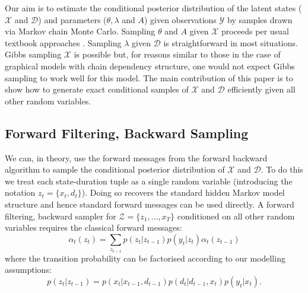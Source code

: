 Our aim is to estimate the conditional posterior distribution of the latent states ($\mathcal{X}$ and $\mathcal{D}$) and parameters ($\theta, \lambda$ and $A$) given observations $\mathcal{Y}$ by samples drawn via Markov chain Monte Carlo. Sampling $\theta$ and $A$ given $\mathcal{X}$ proceeds per usual textbook approaches \cite{Bishop06}.  Sampling $\lambda$ given $\mathcal{D}$ is straightforward in most situations.  Gibbs sampling  $\mathcal{X}$ is possible but, for reasons similar to those in the case of graphical models with chain dependency structure, one would not expect Gibbs sampling to work well for this model.  The main contribution of this paper is to show how to generate exact conditional samples of  $\mathcal{X}$ and $\mathcal{D}$ efficiently given all other random variables.

\subsection{Forward Filtering, Backward Sampling}

We can, in theory, use the forward messages from the forward backward algorithm \cite{Rabiner89} to sample the conditional posterior distribution of $\mathcal{X}$ and $\mathcal{D}.$   To do this we treat each state-duration tuple as a single random variable 
(introducing the notation $z_t = \{x_t,d_t\}$).  
Doing so recovers the standard hidden Markov model structure and hence standard forward messages can be used directly.  A forward filtering, backward sampler for $\mathcal{Z} = \{z_1, \ldots, x_T\}$ conditioned on 
all other random variables
requires the classical forward messages:
    \begin{equation}
        \alpha_t(z_t) = 
        \sum_{z_{t-1}}
        p(z_t | z_{t-1}) 
        p(y_t|z_t) 
        \alpha_t(z_{t-1}) 
        \label{eqn:forward recursion}
    \end{equation}
     where the transition probability can be factorised according to our modelling assumptions:
     \begin{equation}
        p(z_{t} | z_{t-1}) = p(x_t | x_{t-1}, d_{t-1}) p(d_t | d_{t-1}, x_t) p(y_t|x_t).
     \end{equation}

